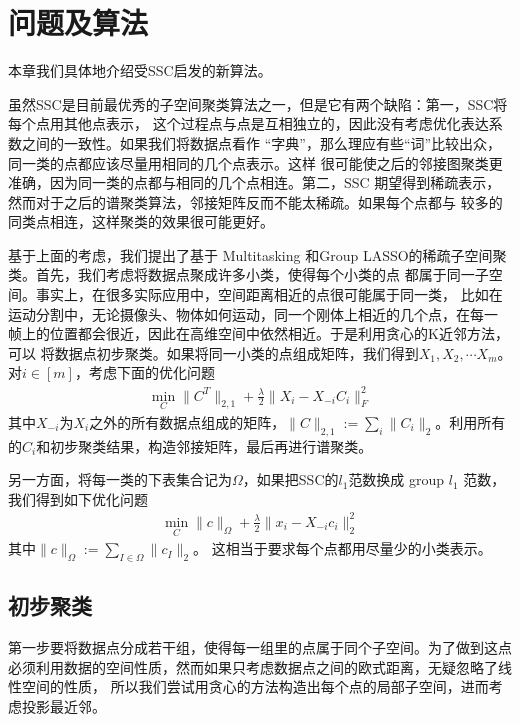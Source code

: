 \documentclass[main]{subfiles}
\begin{document}
\chapter{问题及算法}\label{chp:prob_setup}
本章我们具体地介绍受SSC启发的新算法。

虽然SSC是目前最优秀的子空间聚类算法之一，但是它有两个缺陷：第一，SSC将每个点用其他点表示，
这个过程点与点是互相独立的，因此没有考虑优化表达系数之间的一致性。如果我们将数据点看作
“字典”，那么理应有些“词”比较出众，同一类的点都应该尽量用相同的几个点表示。这样
很可能使之后的邻接图聚类更准确，因为同一类的点都与相同的几个点相连。第二，SSC
期望得到稀疏表示，然而对于之后的谱聚类算法，邻接矩阵反而不能太稀疏。如果每个点都与
较多的同类点相连，这样聚类的效果很可能更好。

基于上面的考虑，我们提出了基于 Multitasking 和Group
LASSO的稀疏子空间聚类。首先，我们考虑将数据点聚成许多小类，使得每个小类的点
都属于同一子空间。事实上，在很多实际应用中，空间距离相近的点很可能属于同一类，
比如在运动分割中，无论摄像头、物体如何运动，同一个刚体上相近的几个点，在每一
帧上的位置都会很近，因此在高维空间中依然相近。于是利用贪心的K近邻方法，可以
将数据点初步聚类。如果将同一小类的点组成矩阵，我们得到$X_1, X_2, \cdots X_m$。
对$i\in [m]$，考虑下面的优化问题
\begin{align}
  \min_C \|C^T\|_{2,1} + \frac{\lambda}{2} \|X_i - X_{-i}C_i\|_F^2
  \label{wq:multi}
\end{align}
其中$X_{-i}$为$X_i$之外的所有数据点组成的矩阵，$\|C\|_{2, 1}:= \sum_i
\|C_i\|_2$。利用所有的$C_i$和初步聚类结果，构造邻接矩阵，最后再进行谱聚类。

另一方面，将每一类的下表集合记为$\Omega$，如果把SSC的$l_1$范数换成 group $l_1$
范数，我们得到如下优化问题
\begin{align}
  \min_C \|c\|_{\Omega} + \frac{\lambda}{2}\|x_i - X_{-i} c_i\|_2^2
  \label{eq:group}
\end{align}
其中$\|c\|_{\Omega}:= \sum_{I\in \Omega}\|c_{I}\|_2$。
这相当于要求每个点都用尽量少的小类表示。

\section{初步聚类} 

第一步要将数据点分成若干组，使得每一组里的点属于同个子空间。为了做到这点
必须利用数据的空间性质，然而如果只考虑数据点之间的欧式距离，无疑忽略了线性空间的性质，
所以我们尝试用贪心的方法构造出每个点的局部子空间，进而考虑投影最近邻。
\end{document}
